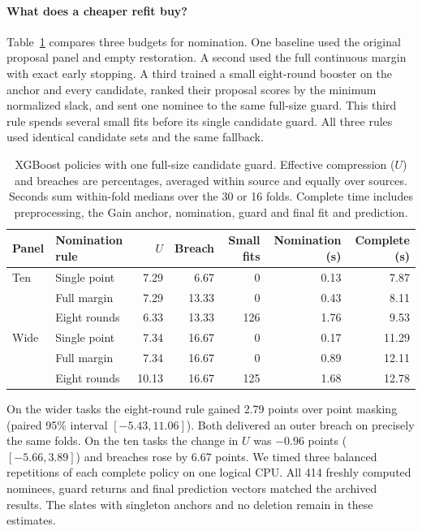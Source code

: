 \paragraph{What does a cheaper refit buy?}
Table~\ref{tab:practical-budget} compares three budgets for nomination. One baseline used the original proposal panel and empty restoration. A second used the full continuous margin with exact early stopping. A third trained a small eight-round booster on the anchor and every candidate, ranked their proposal scores by the minimum normalized slack, and sent one nominee to the same full-size guard. This third rule spends several small fits before its single candidate guard. All three rules used identical candidate sets and the same fallback.

\begin{table}[tb]
\centering\small
\caption{XGBoost policies with one full-size candidate guard. Effective compression ($U$) and breaches are percentages, averaged within source and equally over sources. Seconds sum within-fold medians over the 30 or 16 folds. Complete time includes preprocessing, the Gain anchor, nomination, guard and final fit and prediction.}
\label{tab:practical-budget}
\begin{tabular}{@{}llrrrrr@{}}
\toprule
Panel & Nomination rule & $U$ & Breach & Small fits & Nomination (s) & Complete (s)\\
\midrule
Ten  & Single point & 7.29 & 6.67 & 0 & 0.13 & 7.87\\
     & Full margin  & 7.29 & 13.33 & 0 & 0.43 & 8.11\\
     & Eight rounds & 6.33 & 13.33 & 126 & 1.76 & 9.53\\
Wide & Single point & 7.34 & 16.67 & 0 & 0.17 & 11.29\\
     & Full margin  & 7.34 & 16.67 & 0 & 0.89 & 12.11\\
     & Eight rounds & 10.13 & 16.67 & 125 & 1.68 & 12.78\\
\bottomrule
\end{tabular}
\end{table}

On the wider tasks the eight-round rule gained 2.79 points over point masking (paired 95\% interval $[-5.43,11.06]$). Both delivered an outer breach on precisely the same folds. On the ten tasks the change in $U$ was $-0.96$ points ($[-5.66,3.89]$) and breaches rose by 6.67 points. We timed three balanced repetitions of each complete policy on one logical CPU. All 414 freshly computed nominees, guard returns and final prediction vectors matched the archived results. The slates with singleton anchors and no deletion remain in these estimates.
